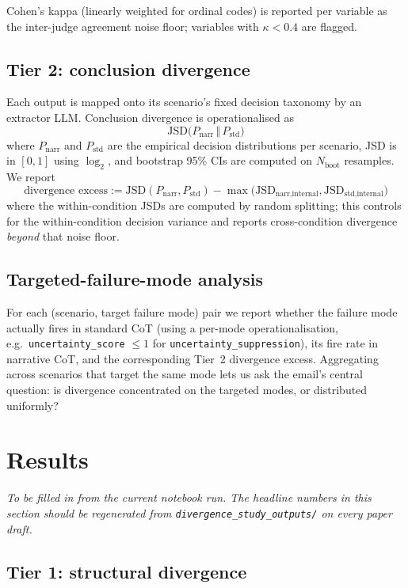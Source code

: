 \documentclass[11pt]{article}
\begin{document}
Cohen's kappa (linearly weighted for ordinal codes) is reported per
variable as the inter-judge agreement noise floor; variables with $\kappa <
0.4$ are flagged.

\subsection{Tier 2: conclusion divergence}

Each output is mapped onto its scenario's fixed decision taxonomy by an
extractor LLM. Conclusion divergence is operationalised as
\[
  \mathrm{JSD}\bigl(P_{\text{narr}} \,\big\Vert\, P_{\text{std}}\bigr)
\]
where $P_{\text{narr}}$ and $P_{\text{std}}$ are the empirical decision
distributions per scenario, JSD is in $[0, 1]$ using $\log_2$, and bootstrap
95\% CIs are computed on $N_{\text{boot}}$ resamples. We report
\[
  \text{divergence excess}
  := \mathrm{JSD}(P_{\text{narr}}, P_{\text{std}})
  - \max\bigl(\mathrm{JSD}_{\text{narr,internal}},
              \mathrm{JSD}_{\text{std,internal}}\bigr)
\]
where the within-condition JSDs are computed by random splitting; this
controls for the within-condition decision variance and reports
cross-condition divergence \emph{beyond} that noise floor.

\subsection{Targeted-failure-mode analysis}

For each (scenario, target failure mode) pair we report whether the failure
mode actually fires in standard CoT (using a per-mode operationalisation,
e.g.\ \texttt{uncertainty\_score} $\le 1$ for \texttt{uncertainty\_suppression}),
its fire rate in narrative CoT, and the corresponding Tier~2 divergence
excess. Aggregating across scenarios that target the same mode lets us ask
the email's central question: is divergence concentrated on the targeted
modes, or distributed uniformly?

\section{Results}
\label{sec:results}

\textit{To be filled in from the current notebook run. The headline numbers
in this section should be regenerated from \texttt{divergence\_study\_outputs/}
on every paper draft.}

\subsection{Tier 1: structural divergence}
\end{document}

